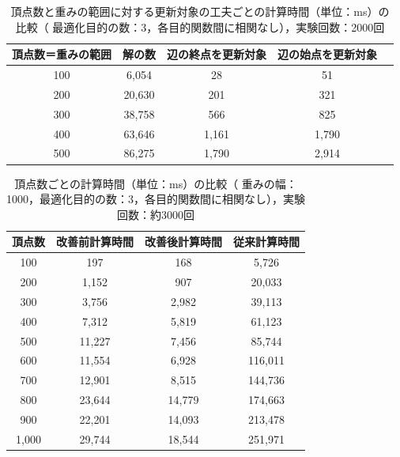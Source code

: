 \documentclass[12pt]{optlab-bachelor}
\begin{document}
\begin{table}[h]
  \centering
  \caption{頂点数と重みの範囲に対する更新対象の工夫ごとの計算時間（単位：ms）の比較（
  最適化目的の数：3，各目的関数間に相関なし），実験回数：2000回}
  {\small
  \begin{tabular}{|c|c|c|c|c|} \hline
    頂点数＝重みの範囲 & 解の数 & 辺の終点を更新対象 & 辺の始点を更新対象 \\ \hline
    100 & 6,054 & 28 & 51 \\ \hline
    200 & 20,630 & 201 & 321 \\ \hline
    300 & 38,758 & 566 & 825 \\ \hline
    400 & 63,646 & 1,161 & 1,790 \\ \hline
    500 & 86,275 & 1,790 & 2,914 \\ \hline
  \end{tabular}
  }
\end{table}

\begin{table}[h]
  \centering
  \caption{頂点数ごとの計算時間（単位：ms）の比較（
  重みの幅：1000，最適化目的の数：3，各目的関数間に相関なし），実験回数：約3000回}
  {\small
  \begin{tabular}{|c|c|c|c|} \hline
    頂点数 & 改善前計算時間 & 改善後計算時間 & 従来計算時間 \\ \hline
    100 & 197 & 168 & 5,726 \\ \hline
    200 & 1,152 & 907 & 20,033 \\ \hline
    300 & 3,756 & 2,982 & 39,113 \\ \hline
    400 & 7,312 & 5,819 & 61,123 \\ \hline
    500 & 11,227 & 7,456 & 85,744 \\ \hline
    600 & 11,554 & 6,928 & 116,011 \\ \hline
    700 & 12,901 & 8,515 & 144,736 \\ \hline
    800 & 23,644 & 14,779 & 174,663 \\ \hline
    900 & 22,201 & 14,093 & 213,478 \\ \hline
    1,000 & 29,744 & 18,544 & 251,971 \\ \hline
  \end{tabular}
  }
\end{table}
\end{document}
